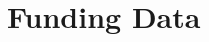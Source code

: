 \documentclass[10pt,subscriptcorrection,upint,varvw,barcolor=Goldenrod3,mathalfa=cal=euler,balance,hyphenate,french,pdf-a, nolists,nofoot]  %
{asmejour} %
\begin{document}
\section*{Funding Data}










% 
% 

\end{document}

